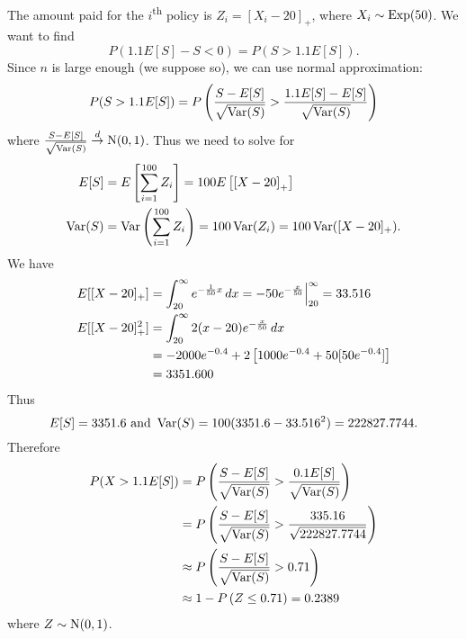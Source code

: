 \documentclass[notoc,notitlepage]{tufte-book}
\begin{document}
\begin{solution}
  The amount paid for the $i$\textsuperscript{th} policy is $Z_i = [ X_i - 20 ]_+$, where $X_i \sim \operatorname{Exp}(50)$. We want to find
  \begin{equation*}
    P( 1.1 E[S] - S < 0 ) = P ( S > 1.1 E[S] ).
  \end{equation*}
  Since $n$ is large enough (we suppose so), we can use normal approximation:
  \begin{equation*}
    P( S > 1.1 E[S] ) = P \left( \frac{S - E[S]}{\sqrt{ \operatorname{Var}(S) }} > \frac{1.1 E[S] - E[S]}{\sqrt{\operatorname{Var}(S)}} \right)
  \end{equation*}
  where $\frac{S - E[S]}{\sqrt{\operatorname{Var}(S)}} \overset{d}{\to} \operatorname{N}(0, 1)$. Thus we need to solve for
  \begin{align*}
    E[S] &= E \left[ \sum_{i=1}^{100} Z_i \right] = 100 E \left[ \left[ X - 20 \right]_+ \right] \\
    \operatorname{Var}(S) &= \operatorname{Var} \left( \sum_{i=1}^{100} Z_i \right) = 100 \operatorname{Var}(Z_i) = 100 \operatorname{Var}( [ X - 20 ]_+ ).
  \end{align*}
  We have
  \begin{align*}
    E [ [ X - 20 ]_+ ] &= \int_{20}^{\infty} e^{-\frac{1}{50}x} \mathop{}\!d{x} = -50e^{-\frac{x}{50}} \Big|_{20}^{\infty} = 33.516 \\
    E [ [ X - 20 ]_+^2 ] &= \int_{20}^{\infty} 2(x - 20)e^{-\frac{x}{50}} \mathop{}\!d{x} \\
                         &= -2000e^{-0.4} + 2 \left[ 1000e^{-0.4} + 50 [ 50e^{-0.4} ] \right] \\
                         &= 3351.600
  \end{align*}
  Thus
  \begin{equation*}
    E[S] = 3351.6 \text{ and } \operatorname{Var}(S) = 100 ( 3351.6 - 33.516^2 ) = 222827.7744.
  \end{equation*}
  Therefore
  \begin{align*}
    P(X > 1.1E[S]) &= P \left( \frac{S - E[S]}{\sqrt{\operatorname{Var}(S)}} > \frac{0.1 E[S]}{\sqrt{\operatorname{Var}(S)}} \right) \\
                   &= P \left( \frac{S - E[S]}{\sqrt{\operatorname{Var}(S)}} > \frac{335.16}{\sqrt{ 222827.7744 }} \right) \\
                   &\approx P \left( \frac{S - E[S]}{\sqrt{\operatorname{Var}(S)}} > 0.71 \right) \\
                   &\approx 1 - P \left( Z \leq 0.71 \right) = 0.2389
  \end{align*}
  where $Z \sim \operatorname{N}(0, 1)$.
\end{solution}
\end{document}
